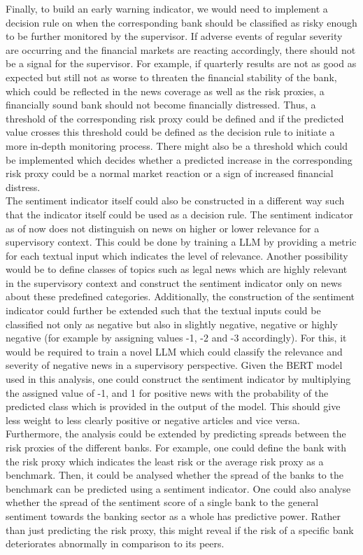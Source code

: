 Finally, to build an early warning indicator, we would need to implement a decision rule on when the corresponding bank should be classified as risky enough to be further monitored by the supervisor. If adverse events of regular severity are occurring and the financial markets are reacting accordingly, there should not be a signal for the supervisor. For example, if quarterly results are not as good as expected but still not as worse to threaten the financial stability of the bank, which could be reflected in the news coverage as well as the risk proxies, a financially sound bank should not become financially distressed. Thus, a threshold of the corresponding risk proxy could be defined and if the predicted value crosses this threshold could be defined as the decision rule to initiate a more in-depth monitoring process. There might also be a threshold which could be implemented which decides whether a predicted increase in the corresponding risk proxy could be a normal market reaction or a sign of increased financial distress. \\

The sentiment indicator itself could also be constructed in a different way such that the indicator itself could be used as a decision rule. The sentiment indicator as of now does not distinguish on news on higher or lower relevance for a supervisory context. This could be done by training a LLM by providing a metric for each textual input which indicates the level of relevance. Another possibility would be to define classes of topics such as legal news which are highly relevant in the supervisory context and construct the sentiment indicator only on news about these predefined categories. Additionally, the construction of the sentiment indicator could further be extended such that the textual inputs could be classified not only as negative but also in slightly negative, negative or highly negative (for example by assigning values -1, -2 and -3 accordingly). For this, it would be required to train a novel LLM which could classify the relevance and severity of negative news in a supervisory perspective. Given the BERT model used in this analysis, one could construct the sentiment indicator by multiplying the assigned value of -1, and 1 for positive news with the probability of the predicted class which is provided in the output of the model. This should give less weight to less clearly positive or negative articles and vice versa. \\

Furthermore, the analysis could be extended by predicting spreads between the risk proxies of the different banks. For example, one could define the bank with the risk proxy which indicates the least risk or the average risk proxy as a benchmark. Then, it could be analysed whether the spread of the banks to the benchmark can be predicted using a sentiment indicator. One could also analyse whether the spread of the sentiment score of a single bank to the general sentiment towards the banking sector as a whole has predictive power. Rather than just predicting the risk proxy, this might reveal if the risk of a specific bank deteriorates abnormally in comparison to its peers.


\cleardoublepage
